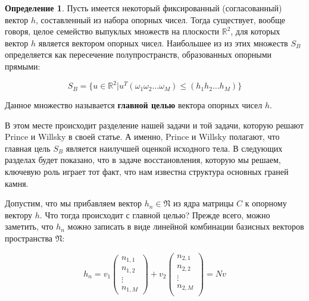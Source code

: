 \documentclass[a4paper, 12pt, titlepage]{article}
\theoremstyle{definition}
\newtheorem{SmartDefinition}{Определение}
\theoremstyle{plain}
\theoremstyle{plain}
\begin{document}
\begin{SmartDefinition}
 \label{def:basic-object}
 Пусть имеется некоторый фиксированный (согласованный) вектор $h$, составленный
 из набора опорных чисел. Тогда существует, вообще говоря, целое семейство
 выпуклых множеств на плоскости $\mathbb{R}^{2}$, для которых вектор $h$
 является вектором опорных чисел. Наибольшее из из этих множеств $S_{B}$
 определяется как пересечение полупространств, образованных опорными прямыми:

 \begin{equation}
 S_{B} = \{u \in \mathbb{R}^{2} |
 u^{T} (\omega_{1} \omega_{2} \ldots \omega_{M}) \leq
 (h_{1} h_{2} \ldots h_{M})\}
 \end{equation}

 Данное множество называется \textbf{главной целью} вектора опорных чисел $h$.
\end{SmartDefinition}

В этом месте происходит разделение нашей задачи и той задачи, которую решают
Prince и Willsky в своей статье. А именно, Prince и Willsky полагают, что
главная цель $S_{B}$ является наилучшей оценкой исходного тела. В следующих
разделах будет показано, что в задаче восстановления, которую мы решаем,
ключевую роль играет тот факт, что нам известна структура основных граней камня.

Допустим, что мы прибавляем вектор $h_{n} \in \mathfrak{N}$ из ядра матрицы $C$
к опорному вектору $h$. Что тогда происходит с главной целью? Прежде всего,
можно заметить, что $h_{n}$ можно записать в виде линейной комбинации базисных
векторов пространства $\mathfrak{N}$:

\begin{equation}
h_{n} = v_{1} \left(
  \begin{array}{c}
   n_{1, 1} \\
   n_{1, 2} \\
   \vdots \\
   n_{1, M}
  \end{array}
  \right) + v_{2} \left(
  \begin{array}{c}
   n_{2, 1} \\
   n_{2, 2} \\
   \vdots \\
   n_{2, M} \\
  \end{array}
  \right) = N v
\end{equation}
\end{document}
